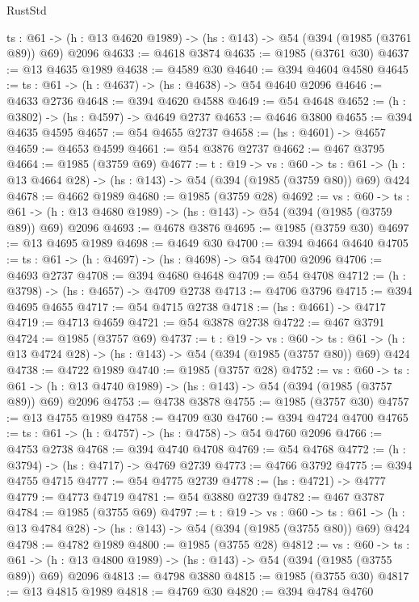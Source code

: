 \begin{lexlean}{RustStd}
\begin{coremodule}
  {ts : @61} -> (h : @13 @4620 @1989) -> (hs : @143) -> @54 (@394 (@1985 (@3761 @89)) @69) @2096
@4633 := @4618 @3874
@4635 := @1985 (@3761 @30)
@4637 := @13 @4635 @1989
@4638 := @4589 @30
@4640 := @394 @4604 @4580
@4645 := {ts : @61} -> (h : @4637) -> (hs : @4638) -> @54 @4640 @2096
@4646 := @4633 @2736
@4648 := @394 @4620 @4588
@4649 := @54 @4648
@4652 := (h : @3802) -> (hs : @4597) -> @4649 @2737
@4653 := @4646 @3800
@4655 := @394 @4635 @4595
@4657 := @54 @4655 @2737
@4658 := (hs : @4601) -> @4657
@4659 := @4653 @4599
@4661 := @54 @3876 @2737
@4662 := @467 @3795
@4664 := @1985 (@3759 @69)
@4677 := {t : @19} ->
  {vs : @60} ->
  {ts : @61} -> (h : @13 @4664 @28) -> (hs : @143) -> @54 (@394 (@1985 (@3759 @80)) @69) @424
@4678 := @4662 @1989
@4680 := @1985 (@3759 @28)
@4692 := {vs : @60} ->
  {ts : @61} -> (h : @13 @4680 @1989) -> (hs : @143) -> @54 (@394 (@1985 (@3759 @89)) @69) @2096
@4693 := @4678 @3876
@4695 := @1985 (@3759 @30)
@4697 := @13 @4695 @1989
@4698 := @4649 @30
@4700 := @394 @4664 @4640
@4705 := {ts : @61} -> (h : @4697) -> (hs : @4698) -> @54 @4700 @2096
@4706 := @4693 @2737
@4708 := @394 @4680 @4648
@4709 := @54 @4708
@4712 := (h : @3798) -> (hs : @4657) -> @4709 @2738
@4713 := @4706 @3796
@4715 := @394 @4695 @4655
@4717 := @54 @4715 @2738
@4718 := (hs : @4661) -> @4717
@4719 := @4713 @4659
@4721 := @54 @3878 @2738
@4722 := @467 @3791
@4724 := @1985 (@3757 @69)
@4737 := {t : @19} ->
  {vs : @60} ->
  {ts : @61} -> (h : @13 @4724 @28) -> (hs : @143) -> @54 (@394 (@1985 (@3757 @80)) @69) @424
@4738 := @4722 @1989
@4740 := @1985 (@3757 @28)
@4752 := {vs : @60} ->
  {ts : @61} -> (h : @13 @4740 @1989) -> (hs : @143) -> @54 (@394 (@1985 (@3757 @89)) @69) @2096
@4753 := @4738 @3878
@4755 := @1985 (@3757 @30)
@4757 := @13 @4755 @1989
@4758 := @4709 @30
@4760 := @394 @4724 @4700
@4765 := {ts : @61} -> (h : @4757) -> (hs : @4758) -> @54 @4760 @2096
@4766 := @4753 @2738
@4768 := @394 @4740 @4708
@4769 := @54 @4768
@4772 := (h : @3794) -> (hs : @4717) -> @4769 @2739
@4773 := @4766 @3792
@4775 := @394 @4755 @4715
@4777 := @54 @4775 @2739
@4778 := (hs : @4721) -> @4777
@4779 := @4773 @4719
@4781 := @54 @3880 @2739
@4782 := @467 @3787
@4784 := @1985 (@3755 @69)
@4797 := {t : @19} ->
  {vs : @60} ->
  {ts : @61} -> (h : @13 @4784 @28) -> (hs : @143) -> @54 (@394 (@1985 (@3755 @80)) @69) @424
@4798 := @4782 @1989
@4800 := @1985 (@3755 @28)
@4812 := {vs : @60} ->
  {ts : @61} -> (h : @13 @4800 @1989) -> (hs : @143) -> @54 (@394 (@1985 (@3755 @89)) @69) @2096
@4813 := @4798 @3880
@4815 := @1985 (@3755 @30)
@4817 := @13 @4815 @1989
@4818 := @4769 @30
@4820 := @394 @4784 @4760

\end{coremodule}
\end{lexlean}
